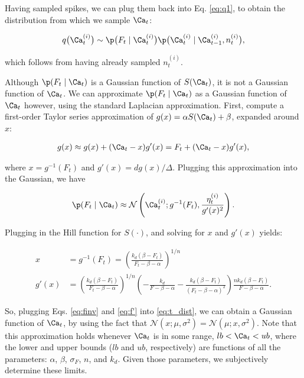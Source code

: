 Having sampled spikes, we can plug them back into Eq. \ref{eq:q1}, to obtain the distribution from which we sample $\Ca_t$:

\begin{align} \label{eq:q_C}
q\big(\Ca_t^{(i)}\big) \sim \p\big(F_t \mid \Ca_t^{(i)}\big) \p\big(\Ca_t^{(i)} \mid \Ca_{t-1}^{(i)}, n_t^{(i)}\big),
\end{align} 

\noindent which follows from having already sampled $n_t^{(i)}$. 

Although $\p(F_t \mid \Ca_t)$ is a Gaussian function of $S(\Ca_t)$, it is not a Gaussian function of $\Ca_t$.  We can approximate $\p(F_t \mid \Ca_t)$ as a Gaussian function of $\Ca_t$ however, using the standard Laplacian approximation.   First, compute a first-order Taylor series approximation of $g(x)=\alpha S(\Ca_t)+\beta$, expanded around $x$:

\begin{align}
g(x) \approx g(x) + (\Ca_t - x) g'(x) = F_t + (\Ca_t - x) g'(x),
\end{align}

\noindent where $x = g^{-1}(F_t)$ and $g'(x)=dg(x)/\Delta$. Plugging this approximation into the Gaussian, we have

\begin{align} \label{eq:t_dist}
\p(F_t \mid \Ca_t) \approx \mathcal{N}\left(\Ca_t^{(i)}; g^{-1}(F_t), \frac{\eta_t^{(i)}}{g'(x)^2}\right).
\end{align}

\noindent Plugging in the Hill function for $S(\cdot)$, and solving for $x$ and $g'(x)$ yields:

\begin{align} \label{eq:finv}
x &= g^{-1}(F_t) =  \left(\frac{k_d (\beta - F_t)}{F_t - \beta - \alpha}\right)^{1/n}\\ \label{eq:f'}
g'(x) &= \left(\frac{k_d (\beta -F_t)}{F_t - \beta - \alpha}\right)^{1/n} \left(-\frac{k_d}{F-\beta-\alpha}-\frac{k_d(\beta-F_t)}{(F_t-\beta-\alpha)^2}\right) \frac{n k_d (\beta - F_t)}{F-\beta-\alpha}.
\end{align}

\noindent So, plugging Eqs. \ref{eq:finv} and \ref{eq:f'} into \ref{eq:t_dist}, we can obtain a Gaussian function of $\Ca_t$, by using the fact that $\mathcal{N}(x;\mu,\sigma^2)=\mathcal{N}(\mu;x,\sigma^2)$. Note that this approximation holds whenever $\Ca_t$ is in some range, $lb<\Ca_t<ub$, where the lower and upper bounds ($lb$ and $ub$, respectively) are functions of all the parameters: $\alpha$, $\beta$, $\sigma_F$, $n$, and $k_d$. Given those parameters, we subjectively determine these limits.


